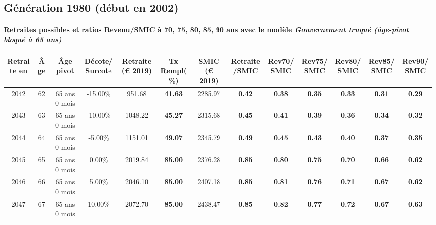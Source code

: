 \newpage 
 
\subsection{Génération 1980 (début en 2002)} 

\paragraph{Retraites possibles et ratios Revenu/SMIC à 70, 75, 80, 85, 90 ans avec le modèle \emph{Gouvernement truqué (âge-pivot bloqué à 65 ans)}}  
 
{ \scriptsize \begin{center} 
\begin{tabular}[htb]{|c|c||c|c||c|c||c||c|c|c|c|c|c|} 
\hline 
 Retraite en &  Âge &  Âge pivot &  Décote/Surcote &  Retraite (\euro{} 2019) &  Tx Rempl(\%) &  SMIC (\euro{} 2019) &  Retraite/SMIC &  Rev70/SMIC &  Rev75/SMIC &  Rev80/SMIC &  Rev85/SMIC &  Rev90/SMIC \\ 
\hline \hline 
 2042 &  62 &  65 ans 0 mois &  -15.00\% &  951.68 &  {\bf 41.63} &  2285.97 &  {\bf {\color{red} 0.42}} &  {\bf {\color{red} 0.38}} &  {\bf {\color{red} 0.35}} &  {\bf {\color{red} 0.33}} &  {\bf {\color{red} 0.31}} &  {\bf {\color{red} 0.29}} \\ 
\hline 
 2043 &  63 &  65 ans 0 mois &  -10.00\% &  1048.22 &  {\bf 45.27} &  2315.68 &  {\bf {\color{red} 0.45}} &  {\bf {\color{red} 0.41}} &  {\bf {\color{red} 0.39}} &  {\bf {\color{red} 0.36}} &  {\bf {\color{red} 0.34}} &  {\bf {\color{red} 0.32}} \\ 
\hline 
 2044 &  64 &  65 ans 0 mois &  -5.00\% &  1151.01 &  {\bf 49.07} &  2345.79 &  {\bf {\color{red} 0.49}} &  {\bf {\color{red} 0.45}} &  {\bf {\color{red} 0.43}} &  {\bf {\color{red} 0.40}} &  {\bf {\color{red} 0.37}} &  {\bf {\color{red} 0.35}} \\ 
\hline 
 2045 &  65 &  65 ans 0 mois &  0.00\% &  2019.84 &  {\bf 85.00} &  2376.28 &  {\bf {\color{red} 0.85}} &  {\bf {\color{red} 0.80}} &  {\bf {\color{red} 0.75}} &  {\bf {\color{red} 0.70}} &  {\bf {\color{red} 0.66}} &  {\bf {\color{red} 0.62}} \\ 
\hline 
 2046 &  66 &  65 ans 0 mois &  5.00\% &  2046.10 &  {\bf 85.00} &  2407.18 &  {\bf {\color{red} 0.85}} &  {\bf {\color{red} 0.81}} &  {\bf {\color{red} 0.76}} &  {\bf {\color{red} 0.71}} &  {\bf {\color{red} 0.67}} &  {\bf {\color{red} 0.62}} \\ 
\hline 
 2047 &  67 &  65 ans 0 mois &  10.00\% &  2072.70 &  {\bf 85.00} &  2438.47 &  {\bf {\color{red} 0.85}} &  {\bf {\color{red} 0.82}} &  {\bf {\color{red} 0.77}} &  {\bf {\color{red} 0.72}} &  {\bf {\color{red} 0.67}} &  {\bf {\color{red} 0.63}} \\ 
\hline 
\hline 
\end{tabular} 
\end{center} } 
